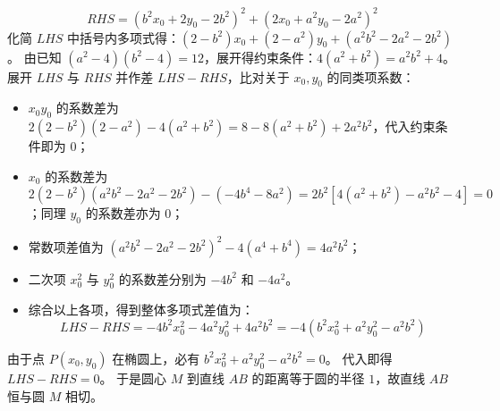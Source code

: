 \begin{solution}
$$ RHS = (b^2 x_0 + 2y_0 - 2b^2)^2 + (2x_0 + a^2 y_0 - 2a^2)^2 $$
化简 $LHS$ 中括号内多项式得：$(2-b^2)x_0 + (2-a^2)y_0 + (a^2 b^2 - 2a^2 - 2b^2)$。
由已知 $(a^2-4)(b^2-4)=12$，展开得约束条件：$4(a^2+b^2) = a^2 b^2 + 4$。
展开 $LHS$ 与 $RHS$ 并作差 $LHS - RHS$，比对关于 $x_0, y_0$ 的同类项系数：
\begin{itemize}
\item $x_0 y_0$ 的系数差为 $2(2-b^2)(2-a^2) - 4(a^2+b^2) = 8 - 8(a^2+b^2) + 2a^2 b^2$，代入约束条件即为 $0$；
\item $x_0$ 的系数差为 $2(2-b^2)(a^2 b^2 - 2a^2 - 2b^2) - (-4b^4 - 8a^2) = 2b^2 [4(a^2+b^2) - a^2 b^2 - 4] = 0$；同理 $y_0$ 的系数差亦为 $0$；
\item 常数项差值为 $(a^2 b^2 - 2a^2 - 2b^2)^2 - 4(a^4+b^4) = 4a^2 b^2$；
\item 二次项 $x_0^2$ 与 $y_0^2$ 的系数差分别为 $-4b^2$ 和 $-4a^2$。
\item 综合以上各项，得到整体多项式差值为：
$$ LHS - RHS = -4b^2 x_0^2 - 4a^2 y_0^2 + 4a^2 b^2 = -4(b^2 x_0^2 + a^2 y_0^2 - a^2 b^2) $$
\end{itemize}
由于点 $P(x_0, y_0)$ 在椭圆上，必有 $b^2 x_0^2 + a^2 y_0^2 - a^2 b^2 = 0$。
代入即得 $LHS - RHS=0$。
于是圆心 $M$ 到直线 $AB$ 的距离等于圆的半径 $1$，故直线 $AB$ 恒与圆 $M$ 相切。
\end{solution}

